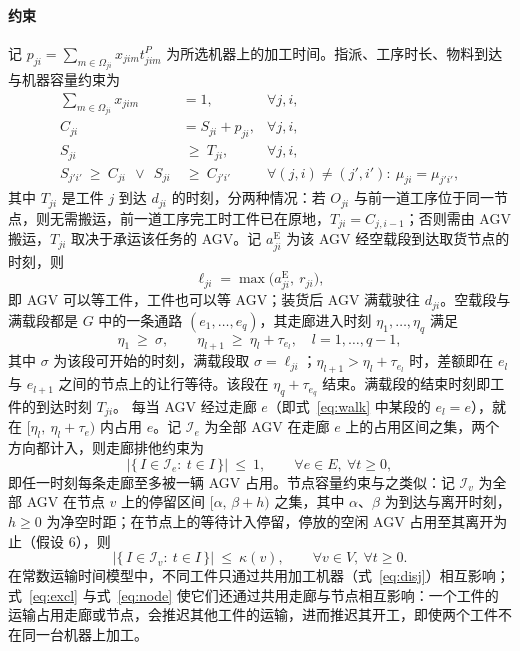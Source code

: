 \documentclass[manuscript,screen,review]{acmart}
\begin{document}
\paragraph{约束}
记 $p_{ji}=\sum_{m\in\Omega_{ji}}x_{jim}t^P_{jim}$ 为所选机器上的加工时间。指派、工序时长、物料到达与机器容量约束为
\begin{align}
\sum_{m\in\Omega_{ji}} x_{jim} &= 1, & \forall j,i,
\label{eq:assign}\\
C_{ji} &= S_{ji}+p_{ji}, & \forall j,i,
\label{eq:dur}\\
S_{ji} &\ \ge\ T_{ji}, & \forall j,i,
\label{eq:material}\\
S_{j'i'}\ \ge\ C_{ji}\ \ \vee\ \ S_{ji} &\ \ge\ C_{j'i'}
& \forall (j,i)\neq(j',i'):\ \mu_{ji}=\mu_{j'i'},
\label{eq:disj}
\end{align}
其中 $T_{ji}$ 是工件 $j$ 到达 $d_{ji}$ 的时刻，分两种情况：若 $O_{ji}$ 与前一道工序位于同一节点，则无需搬运，前一道工序完工时工件已在原地，$T_{ji}=C_{j,i-1}$；否则需由 AGV 搬运，$T_{ji}$ 取决于承运该任务的 AGV。记 $a^{\mathrm{E}}_{ji}$ 为该 AGV 经空载段到达取货节点的时刻，则
\begin{equation}
\label{eq:load}
\ell_{ji}=\max\bigl(a^{\mathrm{E}}_{ji},\ r_{ji}\bigr),
\end{equation}
即 AGV 可以等工件，工件也可以等 AGV；装货后 AGV 满载驶往 $d_{ji}$。空载段与满载段都是 $G$ 中的一条通路 $(e_1,\dots,e_q)$，其走廊进入时刻 $\eta_1,\dots,\eta_q$ 满足
\begin{equation}
\label{eq:walk}
\eta_1 \ \ge\ \sigma, \qquad
\eta_{l+1}\ \ge\ \eta_l+\tau_{e_l}, \quad l=1,\dots,q-1,
\end{equation}
其中 $\sigma$ 为该段可开始的时刻，满载段取 $\sigma=\ell_{ji}$；$\eta_{l+1}>\eta_l+\tau_{e_l}$ 时，差额即在 $e_l$ 与 $e_{l+1}$ 之间的节点上的让行等待。该段在 $\eta_q+\tau_{e_q}$ 结束。满载段的结束时刻即工件的到达时刻 $T_{ji}$。
每当 AGV 经过走廊 $e$（即式~\eqref{eq:walk} 中某段的 $e_l=e$），就在 $[\eta_l,\ \eta_l+\tau_e)$ 内占用 $e$。记 $\mathcal{I}_e$ 为全部 AGV 在走廊 $e$ 上的占用区间之集，两个方向都计入，则走廊排他约束为
\begin{equation}
\label{eq:excl}
\bigl|\{\,I\in\mathcal{I}_e:\ t\in I\,\}\bigr|\ \le\ 1,
\qquad \forall e\in E,\ \forall t\ge 0 ,
\end{equation}
即任一时刻每条走廊至多被一辆 AGV 占用。节点容量约束与之类似：记 $\mathcal{I}_v$ 为全部 AGV 在节点 $v$ 上的停留区间 $[\alpha,\,\beta+h)$ 之集，其中 $\alpha$、$\beta$ 为到达与离开时刻，$h\ge0$ 为净空时距；在节点上的等待计入停留，停放的空闲 AGV 占用至其离开为止（假设 6），则
\begin{equation}
\label{eq:node}
\bigl|\{\,I\in\mathcal{I}_v:\ t\in I\,\}\bigr|\ \le\ \kappa(v),
\qquad \forall v\in V,\ \forall t\ge 0 .
\end{equation}
在常数运输时间模型中，不同工件只通过共用加工机器（式~\eqref{eq:disj}）相互影响；式~\eqref{eq:excl} 与式~\eqref{eq:node} 使它们还通过共用走廊与节点相互影响：一个工件的运输占用走廊或节点，会推迟其他工件的运输，进而推迟其开工，即使两个工件不在同一台机器上加工。
\end{document}
